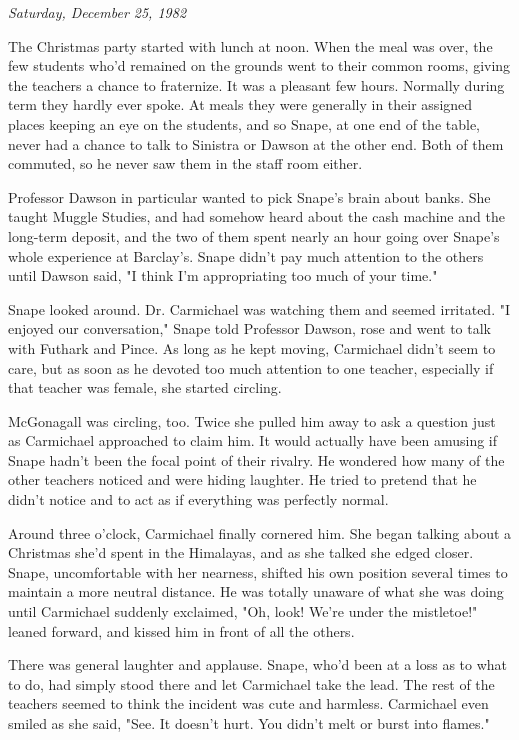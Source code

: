 \documentclass[a4paper,11pt]{article}
\begin{document}
\emph{Saturday, December 25, 1982}

The Christmas party started with lunch at noon. When the meal was over, the few students who'd remained on the grounds went to their common rooms, giving the teachers a chance to fraternize. It was a pleasant few hours. Normally during term they hardly ever spoke. At meals they were generally in their assigned places keeping an eye on the students, and so Snape, at one end of the table, never had a chance to talk to Sinistra or Dawson at the other end. Both of them commuted, so he never saw them in the staff room either.

Professor Dawson in particular wanted to pick Snape's brain about banks. She taught Muggle Studies, and had somehow heard about the cash machine and the long-term deposit, and the two of them spent nearly an hour going over Snape's whole experience at Barclay's. Snape didn't pay much attention to the others until Dawson said, "I think I'm appropriating too much of your time."

Snape looked around. Dr. Carmichael was watching them and seemed irritated. "I enjoyed our conversation," Snape told Professor Dawson, rose and went to talk with Futhark and Pince. As long as he kept moving, Carmichael didn't seem to care, but as soon as he devoted too much attention to one teacher, especially if that teacher was female, she started circling.

McGonagall was circling, too. Twice she pulled him away to ask a question just as Carmichael approached to claim him. It would actually have been amusing if Snape hadn't been the focal point of their rivalry. He wondered how many of the other teachers noticed and were hiding laughter. He tried to pretend that he didn't notice and to act as if everything was perfectly normal.

Around three o'clock, Carmichael finally cornered him. She began talking about a Christmas she'd spent in the Himalayas, and as she talked she edged closer. Snape, uncomfortable with her nearness, shifted his own position several times to maintain a more neutral distance. He was totally unaware of what she was doing until Carmichael suddenly exclaimed, "Oh, look! We're under the mistletoe!" leaned forward, and kissed him in front of all the others.

There was general laughter and applause. Snape, who'd been at a loss as to what to do, had simply stood there and let Carmichael take the lead. The rest of the teachers seemed to think the incident was cute and harmless. Carmichael even smiled as she said, "See. It doesn't hurt. You didn't melt or burst into flames."
\end{document}
